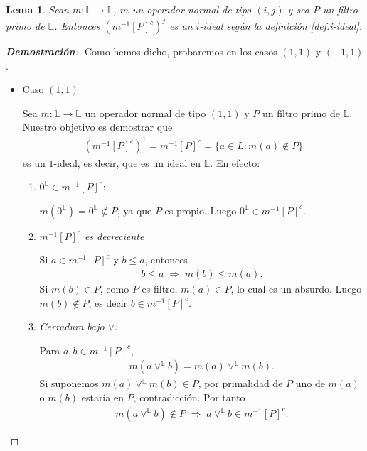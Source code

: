 \documentclass[12pt]{book}
\newtheorem{lemma}[theorem]{Lema}
\begin{document}
\begin{lemma} \label{Ideales} Sean $m:\mathbb{L}\to \mathbb{L}$, $m$ un operador normal de tipo $(i, j)$ y sea $P$ un filtro primo de $\mathbb{L}$. Entonces $\left(m^{-1}[P]^c\right)^j$ es un $i$-ideal según la definición \ref{def:i-ideal}.
\end{lemma}
\begin{proof}[\textbf{Demostración}:]

Como hemos dicho, probaremos en los casos $(1,1)$ y $(-1,1) $.

\begin{itemize}

\item Caso $(1,1)$

Sea $m : \mathbb{L} \to \mathbb{L}$ un operador normal de tipo $(1,1)$ y $P$ un filtro primo de $\mathbb{L}$. Nuestro objetivo es demostrar que
\begin{align*}
\left(m^{-1}[P]^c\right)^1 = m^{-1}[P]^c = \{ a \in L : m(a) \notin P \}
\end{align*}
es un $1$-ideal, es decir, que es un ideal en $\mathbb{L}$. En efecto:
\begin{enumerate}
  \item \textit{$0^{\mathbb{L}}\in m^{-1}[P]^c$}:
  
  $m(0^{\mathbb{L}}) = 0^{\mathbb{L}} \notin P$, ya que $P$ es propio. Luego $0^{\mathbb{L}}\in m^{-1}[P]^c$.
\item \emph{$m^{-1}[P]^c$ es decreciente} 

Si $a\in m^{-1}[P]^c$ y $b\le a$, entonces
  \begin{align*}
    b\le a \;\Longrightarrow\; m(b)\le m(a).
  \end{align*}
  Si $m(b)\in P$, como $P$ es filtro, $m(a)\in P$, lo cual es un absurdo. Luego $m(b)\notin P$, es decir $b\in m^{-1}[P]^c$.

  \item \emph{Cerradura bajo $\vee$:}
  
Para $a,b\in m^{-1}[P]^c$,
  \begin{align*}
    m(a\vee^{\mathbb{L}} b)=m(a)\vee^{\mathbb{L}} m(b).
  \end{align*}
  Si suponemos $m(a)\vee^{\mathbb{L}} m(b)\in P$, por primalidad de $P$ uno de $m(a)$ o $m(b)$ estaría en $P$, contradicción. Por tanto 
  \begin{align*}
    m(a\vee^{\mathbb{L}} b)\notin P
    \;\Longrightarrow\;
    a\vee^{\mathbb{L}} b\in m^{-1}[P]^c.
  \end{align*}
\end{enumerate}


\end{itemize}
\end{proof}
\end{document}
